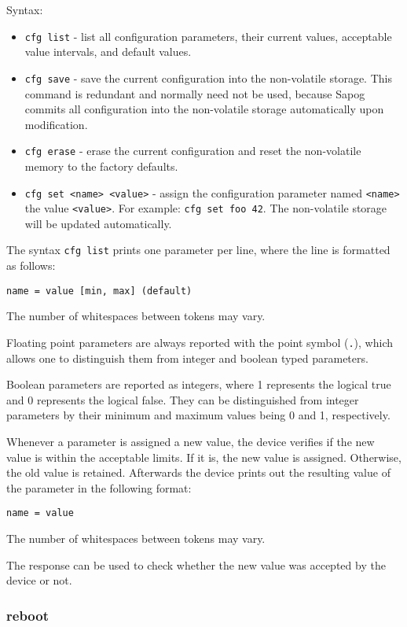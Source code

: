 \documentclass{zubaxdoc}
\begin{document}
Syntax:
\begin{itemize}
	\item \verb|cfg list| - list all configuration parameters, their current values,
	acceptable value intervals, and default values.
	
	\item \verb|cfg save| - save the current configuration into the non-volatile storage.
	This command is redundant and normally need not be used, because Sapog commits all configuration
	into the non-volatile storage automatically upon modification.
	
	\item \verb|cfg erase| - erase the current configuration and reset the non-volatile memory to
	the factory defaults.
	
	\item \verb|cfg set <name> <value>| - assign the configuration parameter named \verb|<name>| the value
	\verb|<value>|. For example: \verb|cfg set foo 42|.
	The non-volatile storage will be updated automatically.
\end{itemize}

The syntax \verb|cfg list| prints one parameter per line, where the line is formatted as follows:

\verb|name = value [min, max] (default)|

The number of whitespaces between tokens may vary.

Floating point parameters are always reported with the point symbol (\verb|.|),
which allows one to distinguish them from integer and boolean typed parameters.

Boolean parameters are reported as integers, where 1 represents the logical true and
0 represents the logical false.
They can be distinguished from integer parameters by their minimum and maximum values being 0 and 1,
respectively.

Whenever a parameter is assigned a new value, the device verifies if the new value is within the
acceptable limits.
If it is, the new value is assigned. Otherwise, the old value is retained.
Afterwards the device prints out the resulting value of the parameter in the following format:

\verb|name = value|

The number of whitespaces between tokens may vary.

The response can be used to check whether the new value was accepted by the device or not.

\subsubsection{reboot}
\end{document}
